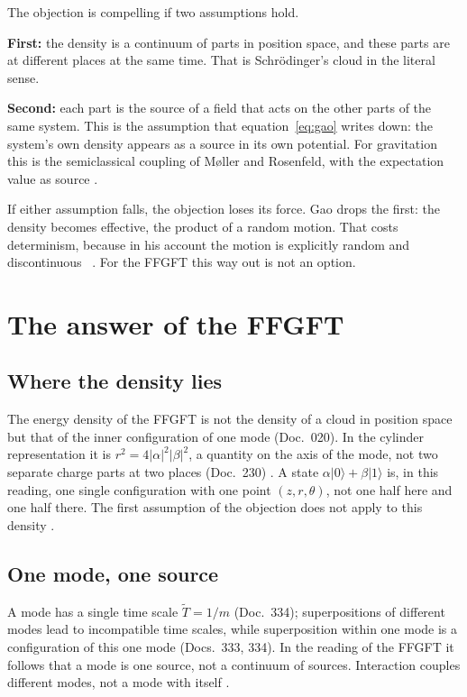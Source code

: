 The objection is compelling if two assumptions hold.

\textbf{First:} the density is a continuum of parts in position space, and these parts are at
different places at the same time. That is Schrödinger's cloud in the literal sense.

\textbf{Second:} each part is the source of a field that acts on the other parts of the same system.
This is the assumption that equation~\eqref{eq:gao} writes down: the system's own density appears as
a source in its own potential. For gravitation this is the semiclassical coupling of Møller and
Rosenfeld, with the expectation value as source \EM.

If either assumption falls, the objection loses its force. Gao drops the first: the density becomes
effective, the product of a random motion. That costs determinism, because in his account the motion
is explicitly random and discontinuous \QM~\cite{Gao2011}. For the FFGFT this way out is not an
option.

\section{The answer of the FFGFT}

\subsection{Where the density lies}

The energy density of the FFGFT is not the density of a cloud in position space but that of the
inner configuration of one mode (Doc.~020). In the cylinder representation it is
$r^2=4|\alpha|^2|\beta|^2$, a quantity on the axis of the mode, not two separate charge parts at two
places (Doc.~230) \BM. A state $\alpha|0\rangle+\beta|1\rangle$ is, in this reading, one single
configuration with one point $(z,r,\theta)$, not one half here and one half there. The first
assumption of the objection does not apply to this density \SM.

\subsection{One mode, one source}

A mode has a single time scale $\tilde T=1/m$ (Doc.~334); superpositions of different modes lead to
incompatible time scales, while superposition within one mode is a configuration of this one mode
(Docs.~333, 334). In the reading of the FFGFT it follows that a mode is one source, not a continuum
of sources. Interaction couples different modes, not a mode with itself \SM.

